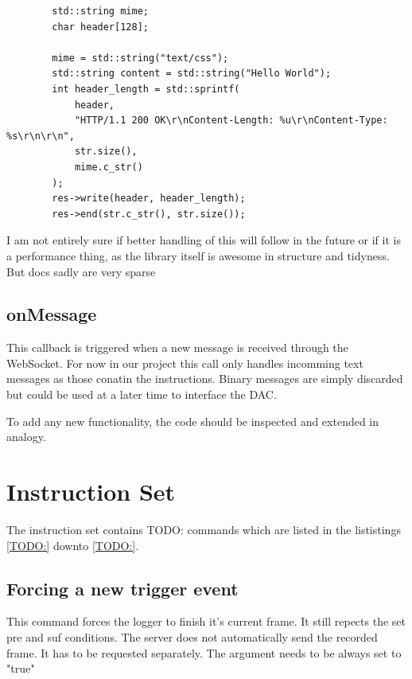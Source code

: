 \begin{listing}
    \begin{verbatim}
        std::string mime;
        char header[128];

        mime = std::string("text/css");
        std::string content = std::string("Hello World");
        int header_length = std::sprintf(
            header,
            "HTTP/1.1 200 OK\r\nContent-Length: %u\r\nContent-Type: %s\r\n\r\n",
            str.size(),
            mime.c_str()
        );
        res->write(header, header_length);
        res->end(str.c_str(), str.size());
    \end{verbatim}
\end{listing}

I am not entirely sure if better handling of this will follow in the future or if it is a performance thing, as the library itself is awesome in structure and tidyness. But docs sadly are very sparse

\subsection{onMessage}

This callback is triggered when a new message is received through the WebSocket.
For now in our project this call only handles incomming text messages as those conatin the instructions.
Binary messages are simply discarded but could be used at a later time to interface the DAC.

To add any new functionality, the code should be inspected and extended in analogy.

\section{Instruction Set}
\label{sec:devguide:server:instruction}

The instruction set contains TODO: commands which are listed in the lististings \ref{TODO:} downto \ref{TODO:}.

\subsection{Forcing a new trigger event}

This command forces the logger to finish it's current frame. It still repects the set pre and suf conditions.
The server does not automatically send the recorded frame. It has to be requested separately.
The argument needs to be always set to "true"

